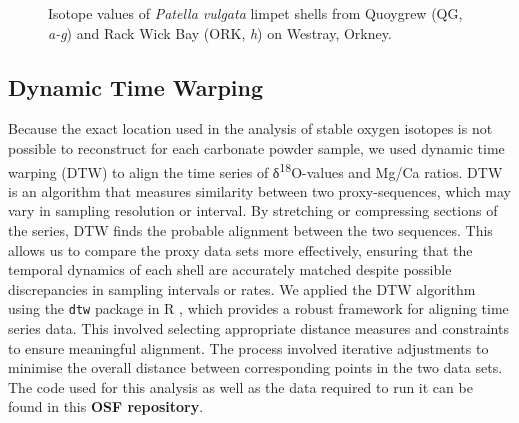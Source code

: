 \documentclass[
  authoryear,
  preprint,
  3p]{elsarticle}
\begin{document}
\begin{figure}


\caption{\label{fig-Pat_iso}Isotope values of \emph{Patella vulgata}
limpet shells from Quoygrew (QG, \emph{a-g}) and Rack Wick Bay (ORK,
\emph{h}) on Westray, Orkney.}

\end{figure}%

\subsection{Dynamic Time Warping}\label{dynamic-time-warping}

Because the exact location used in the analysis of stable oxygen
isotopes is not possible to reconstruct for each carbonate powder
sample, we used dynamic time warping (DTW) to align the time series of
δ\textsuperscript{18}O-values and Mg/Ca ratios. DTW is an algorithm that
measures similarity between two proxy-sequences, which may vary in
sampling resolution or interval. By stretching or compressing sections
of the series, DTW finds the probable alignment between the two
sequences. This allows us to compare the proxy data sets more
effectively, ensuring that the temporal dynamics of each shell are
accurately matched despite possible discrepancies in sampling intervals
or rates. We applied the DTW algorithm using the \texttt{dtw} package in
R \citep{Giorgino2009-sj, R_Core_Team2020-mk}, which provides a robust
framework for aligning time series data. This involved selecting
appropriate distance measures and constraints to ensure meaningful
alignment. The process involved iterative adjustments to minimise the
overall distance between corresponding points in the two data sets. The
code used for this analysis as well as the data required to run it can
be found in this \textbf{OSF repository}.
\end{document}
